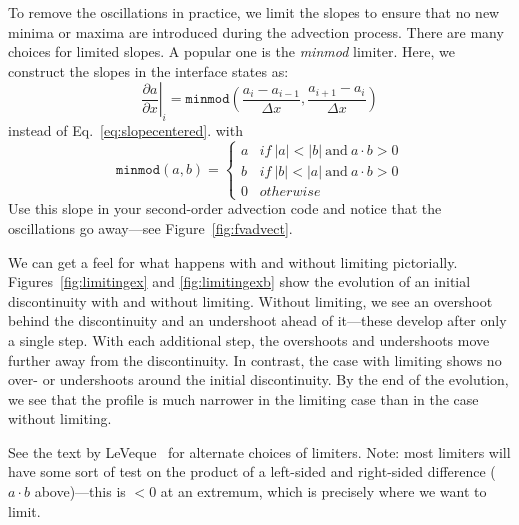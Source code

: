 \begin{exercise}
{To remove the oscillations in
practice, we limit the slopes to ensure that no new minima or maxima are
introduced during the advection process.  There are many choices for
limited slopes.  A popular one is the {\em minmod} limiter.  Here, we
construct the slopes in the interface states as:
\begin{equation}
\left . \frac{\partial a}{\partial x} \right |_i = \mathtt{minmod} \left (
  \frac{a_i - a_{i-1}}{\Delta x}, \frac{a_{i+1} - a_i}{\Delta x} \right )
\end{equation}
instead of Eq.~\ref{eq:slopecentered}.
with 
\begin{equation}
\mathtt{minmod}(a,b) = \left \{ 
    \begin{array}{ll}
    a & \mathit{if~} |a| < |b| \mathrm{~and~} a\cdot b > 0 \\
    b & \mathit{if~} |b| < |a| \mathrm{~and~} a\cdot b > 0 \\
    0 & \mathit{otherwise}
    \end{array}
  \right .
\end{equation}
Use this slope in your second-order advection code and notice that the
oscillations go away---see Figure~\ref{fig:fvadvect}.}
\end{exercise}

We can get a feel for what happens with and without limiting
pictorially.  Figures~\ref{fig:limitingex} and
\ref{fig:limitingexb} show the evolution of an initial discontinuity
with and without limiting.  Without limiting, we see an overshoot
behind the discontinuity and an undershoot ahead of it---these develop
after only a single step.  With each additional step, the overshoots
and undershoots move further away from the discontinuity.  In
contrast, the case with limiting shows no over- or undershoots around
the initial discontinuity.  By the end of the evolution, we see that
the profile is much narrower in the limiting case than in the case
without limiting.

See the text by LeVeque~\cite{leveque:2002} for alternate choices of
limiters. Note: most limiters will have some sort of test on the
product of a left-sided and right-sided difference ($a\cdot b$
above)---this is $< 0$ at an extremum, which is precisely where we
want to limit.

